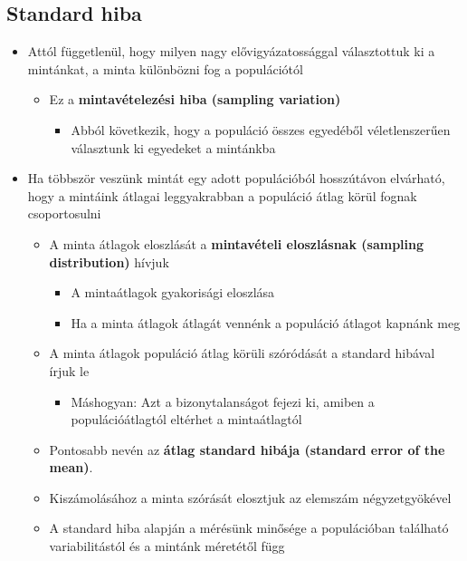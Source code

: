\documentclass[
  letterpaper,
  DIV=11,
  numbers=noendperiod]{scrreprt}
\providecommand{\tightlist}{%
  \setlength{\itemsep}{0pt}\setlength{\parskip}{0pt}}\usepackage{longtable,booktabs,array}
\begin{document}
\hypertarget{standard-hiba}{%
\subsection{Standard hiba}\label{standard-hiba}}

\begin{itemize}
\item
  Attól függetlenül, hogy milyen nagy elővigyázatossággal választottuk
  ki a mintánkat, a minta különbözni fog a populációtól

  \begin{itemize}
  \item
    Ez a \textbf{mintavételezési hiba (sampling variation)}

    \begin{itemize}
    \tightlist
    \item
      Abból következik, hogy a populáció összes egyedéből
      véletlenszerűen választunk ki egyedeket a mintánkba
    \end{itemize}
  \end{itemize}
\item
  Ha többször veszünk mintát egy adott populációból hosszútávon
  elvárható, hogy a mintáink átlagai leggyakrabban a populáció átlag
  körül fognak csoportosulni

  \begin{itemize}
  \item
    A minta átlagok eloszlását a \textbf{mintavételi eloszlásnak
    (sampling distribution)} hívjuk

    \begin{itemize}
    \item
      A mintaátlagok gyakorisági eloszlása
    \item
      Ha a minta átlagok átlagát vennénk a populáció átlagot kapnánk meg
    \end{itemize}
  \item
    A minta átlagok populáció átlag körüli szóródását a standard hibával
    írjuk le

    \begin{itemize}
    \tightlist
    \item
      Máshogyan: Azt a bizonytalanságot fejezi ki, amiben a
      populációátlagtól eltérhet a mintaátlagtól
    \end{itemize}
  \item
    Pontosabb nevén az \textbf{átlag standard hibája (standard error of
    the mean)}.
  \item
    Kiszámolásához a minta szórását elosztjuk az elemszám
    négyzetgyökével
  \item
    A standard hiba alapján a mérésünk minősége a populációban található
    variabilitástól és a mintánk méretétől függ


\end{itemize}
\end{itemize}
\end{document}

